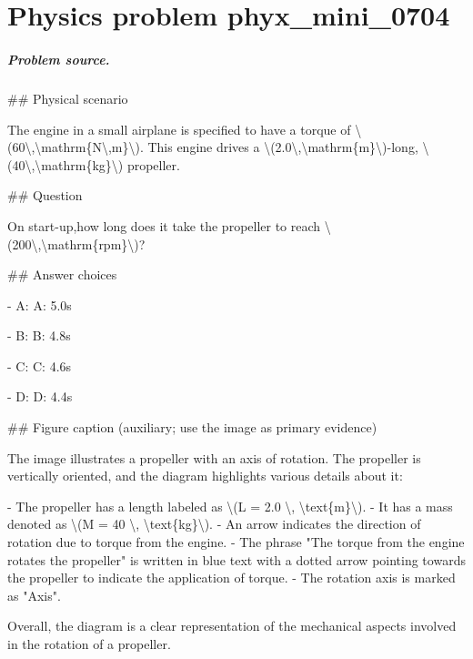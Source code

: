 
\chapter{Physics problem phyx\_mini\_0704}
\label{ch:PhyXMiniProblems_problem_phyx_mini_0704}

\paragraph{Problem source.}
\#\# Physical scenario

The engine in a small airplane is specified to have a torque of \textbackslash{}(60\textbackslash{},\textbackslash{}mathrm\{N\textbackslash{},m\}\textbackslash{}). This engine drives a \textbackslash{}(2.0\textbackslash{},\textbackslash{}mathrm\{m\}\textbackslash{})-long, \textbackslash{}(40\textbackslash{},\textbackslash{}mathrm\{kg\}\textbackslash{}) propeller.

\#\# Question

On start-up,how long does it take the propeller to reach \textbackslash{}(200\textbackslash{},\textbackslash{}mathrm\{rpm\}\textbackslash{})?

\#\# Answer choices

- A: A: 5.0s

- B: B: 4.8s

- C: C: 4.6s

- D: D: 4.4s

\#\# Figure caption (auxiliary; use the image as primary evidence)

The image illustrates a propeller with an axis of rotation. The propeller is vertically oriented, and the diagram highlights various details about it:

- The propeller has a length labeled as \textbackslash{}(L = 2.0 \textbackslash{}, \textbackslash{}text\{m\}\textbackslash{}).
- It has a mass denoted as \textbackslash{}(M = 40 \textbackslash{}, \textbackslash{}text\{kg\}\textbackslash{}).
- An arrow indicates the direction of rotation due to torque from the engine.
- The phrase "The torque from the engine rotates the propeller" is written in blue text with a dotted arrow pointing towards the propeller to indicate the application of torque.
- The rotation axis is marked as "Axis".

Overall, the diagram is a clear representation of the mechanical aspects involved in the rotation of a propeller.

